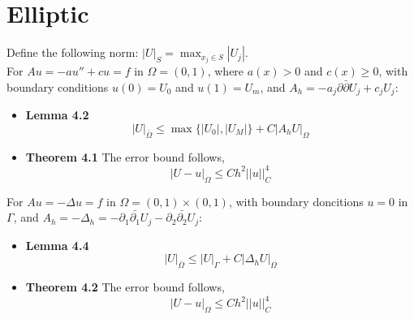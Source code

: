 \documentclass[oneside,a4paper,11pt]{report}
\begin{document}
\chapter{Elliptic}
Define the following norm: $|U|_S = \max_{x_j \in S}|U_j|$.\\
For $Au = -au''+cu=f$ in $\Omega=(0,1)$, where $a(x)>0$ and $c(x)\ge0$, with boundary conditions $u(0) = U_0$ and $u(1) = U_m$, and $A_h = -a_j\partial\bar{\partial}U_j + c_jU_j$:
\begin{itemize}
\item \textbf{Lemma 4.2} $$|U|_{\bar{\Omega}} \le \max\{|U_0|,|U_M|\} + C|A_hU|_{\Omega}$$

\item \textbf{Theorem 4.1} The error bound follows,
$$|U-u|_\Omega \le Ch^2||u||_C^4$$
\end{itemize}
For $Au = -\Delta u=f$ in $\Omega= (0,1)\times(0,1)$, with boundary doncitions $u=0$ in $\Gamma$, and $A_h = -\Delta_h = -\partial_1\bar{\partial_1}U_j - \partial_2\bar{\partial_2}U_j$:
\begin{itemize}
\item \textbf{Lemma 4.4} $$|U|_{\bar{\Omega}} \le |U|_\Gamma + C|\Delta_hU|_\Omega$$

\item \textbf{Theorem 4.2} The error bound follows,
$$|U-u|_\Omega \le Ch^2||u||_C^4$$
\end{itemize}

\end{document}
